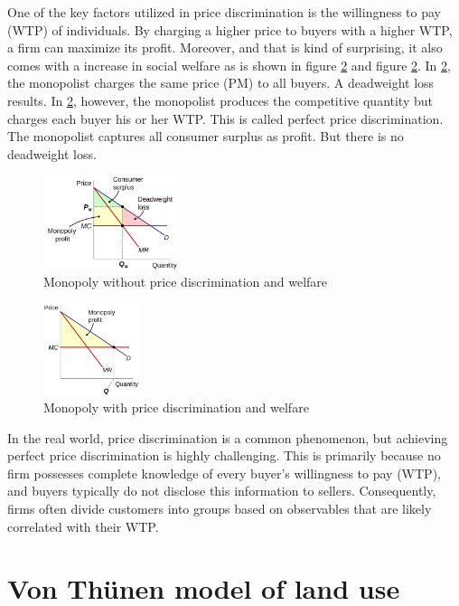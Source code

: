 \documentclass[
  12pt,
  oneside]{book}
\theoremstyle{definition}
\theoremstyle{definition}
\theoremstyle{definition}
\theoremstyle{definition}
\theoremstyle{remark}
\begin{document}
One of the key factors utilized in price discrimination is the willingness to pay (WTP) of individuals. By charging a higher price to buyers with a higher WTP, a firm can maximize its profit. Moreover, and that is kind of surprising, it also comes with a increase in social welfare as is shown in figure \ref{fig:monowpd} and figure \ref{fig:monowpd}. In \ref{fig:monowpd}, the monopolist charges the same price (PM) to all buyers. A deadweight loss results. In \ref{fig:monowpd}, however, the monopolist produces the competitive quantity but charges each buyer his or her WTP. This is called perfect price discrimination. The monopolist captures all consumer surplus as profit. But there is no deadweight loss.

\begin{figure}
\centering
\includegraphics[width=0.35\textwidth,height=\textheight]{fig/discrimination.png}
\caption{\label{fig:monowoutpd} Monopoly without price discrimination and welfare}
\end{figure}

\begin{figure}
\centering
\includegraphics[width=0.25\textwidth,height=\textheight]{fig/discrimination2.png}
\caption{\label{fig:monowpd} Monopoly with price discrimination and welfare}
\end{figure}

In the real world, price discrimination is a common phenomenon, but achieving perfect price discrimination is highly challenging. This is primarily because no firm possesses complete knowledge of every buyer's willingness to pay (WTP), and buyers typically do not disclose this information to sellers. Consequently, firms often divide customers into groups based on observables that are likely correlated with their WTP.

\hypertarget{von-thuxfcnen-model-of-land-use}{%
\section{Von Thünen model of land use}\label{von-thuxfcnen-model-of-land-use}}
\end{document}
